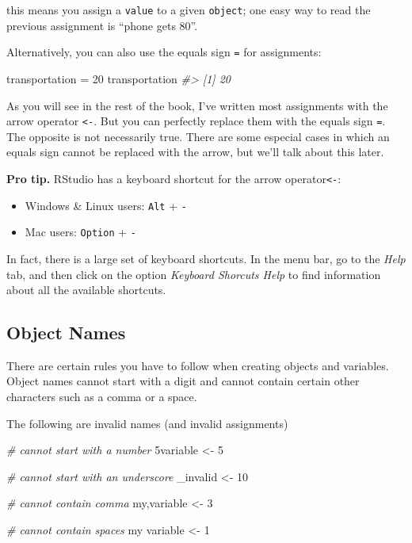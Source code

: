 \documentclass[
]{book}
\newenvironment{Shaded}{\begin{snugshade}}{\end{snugshade}}
\newcommand{\CommentTok}[1]{\textcolor[rgb]{0.56,0.35,0.01}{\textit{#1}}}
\newcommand{\DecValTok}[1]{\textcolor[rgb]{0.00,0.00,0.81}{#1}}
\newcommand{\NormalTok}[1]{#1}
\newcommand{\OtherTok}[1]{\textcolor[rgb]{0.56,0.35,0.01}{#1}}
\begin{document}
this means you assign a \texttt{value} to a given \texttt{object}; one easy way to read the
previous assignment is ``phone gets 80''.

Alternatively, you can also use the equals sign \texttt{=} for assignments:

\begin{Shaded}
\begin{Highlighting}[]
\NormalTok{transportation }\OtherTok{=} \DecValTok{20}
\NormalTok{transportation}
\CommentTok{\#\textgreater{} [1] 20}
\end{Highlighting}
\end{Shaded}

As you will see in the rest of the book, I've written most assignments with the
arrow operator \texttt{\textless{}-}. But you can perfectly replace them with the equals sign
\texttt{=}. The opposite is not necessarily true. There are some especial cases in
which an equals sign cannot be replaced with the arrow, but we'll talk about
this later.

\textbf{Pro tip.} RStudio has a keyboard shortcut for the arrow operator\texttt{\textless{}-}:

\begin{itemize}
\item
  Windows \& Linux users: \texttt{Alt} + \texttt{-}
\item
  Mac users: \texttt{Option} + \texttt{-}
\end{itemize}

In fact, there is a large set of keyboard shortcuts. In the menu bar, go to the
\emph{Help} tab, and then click on the option \emph{Keyboard Shorcuts Help} to find
information about all the available shortcuts.

\hypertarget{object-names}{%
\subsection{Object Names}\label{object-names}}

There are certain rules you have to follow when creating objects and variables.
Object names cannot start with a digit and cannot contain certain other characters
such as a comma or a space.

The following are invalid names (and invalid assignments)

\begin{Shaded}
\begin{Highlighting}[]
\CommentTok{\# cannot start with a number}
\NormalTok{5variable }\OtherTok{\textless{}{-}} \DecValTok{5}

\CommentTok{\# cannot start with an underscore}
\NormalTok{\_invalid }\OtherTok{\textless{}{-}} \DecValTok{10}

\CommentTok{\# cannot contain comma}
\NormalTok{my,variable }\OtherTok{\textless{}{-}} \DecValTok{3}

\CommentTok{\# cannot contain spaces}
\NormalTok{my variable }\OtherTok{\textless{}{-}} \DecValTok{1}
\end{Highlighting}
\end{Shaded}
\end{document}
